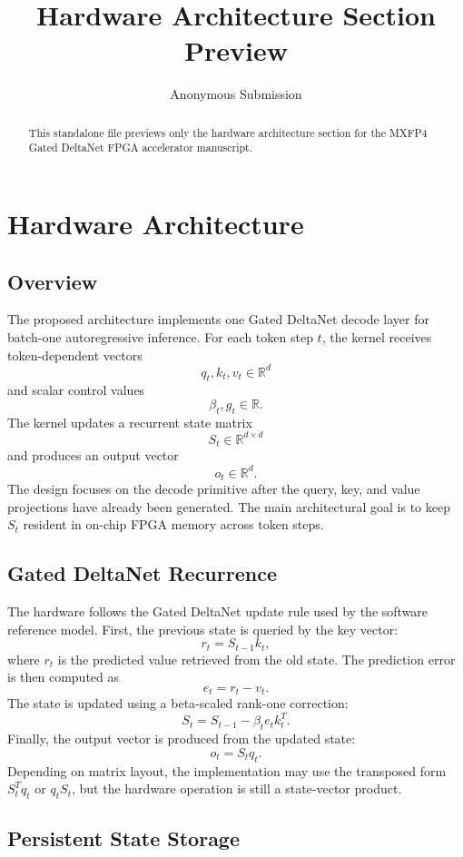 \documentclass[conference]{IEEEtran}
\title{Hardware Architecture Section Preview}
\author{Anonymous Submission}
\begin{document}
\maketitle

\begin{abstract}
This standalone file previews only the hardware architecture section for the
MXFP4 Gated DeltaNet FPGA accelerator manuscript.
\end{abstract}

\section{Hardware Architecture}

\subsection{Overview}

The proposed architecture implements one Gated DeltaNet decode layer for
batch-one autoregressive inference. For each token step $t$, the kernel receives
token-dependent vectors
\[
q_t, k_t, v_t \in \mathbb{R}^{d}
\]
and scalar control values
\[
\beta_t, g_t \in \mathbb{R}.
\]
The kernel updates a recurrent state matrix
\[
S_t \in \mathbb{R}^{d \times d}
\]
and produces an output vector
\[
o_t \in \mathbb{R}^{d}.
\]
The design focuses on the decode primitive after the query, key, and value
projections have already been generated. The main architectural goal is to keep
$S_t$ resident in on-chip FPGA memory across token steps.

\subsection{Gated DeltaNet Recurrence}

The hardware follows the Gated DeltaNet update rule used by the software
reference model. First, the previous state is queried by the key vector:
\[
r_t = S_{t-1} k_t ,
\]
where $r_t$ is the predicted value retrieved from the old state. The prediction
error is then computed as
\[
e_t = r_t - v_t .
\]
The state is updated using a beta-scaled rank-one correction:
\[
S_t = S_{t-1} - \beta_t e_t k_t^{T}.
\]
Finally, the output vector is produced from the updated state:
\[
o_t = S_t q_t .
\]
Depending on matrix layout, the implementation may use the transposed form
$S_t^{T}q_t$ or $q_tS_t$, but the hardware operation is still a state-vector
product.

\subsection{Persistent State Storage}
\end{document}
